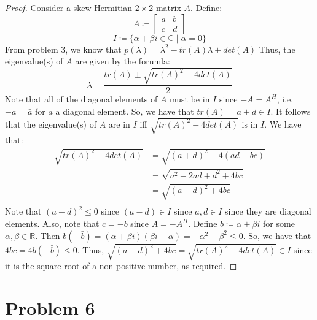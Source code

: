 \documentclass{article}
\begin{document}
\begin{proof}
Consider a skew-Hermitian $2 \times 2$ matrix $A$. Define:
$$A \coloneqq \begin{bmatrix} a & b \\ c & d \end{bmatrix}$$
$$I \coloneqq \{\alpha + \beta i \in \mathbb{C} \mid \alpha = 0\}$$
From problem 3, we know that $p(\lambda) = \lambda^2 - tr(A)\lambda + det(A)$ Thus, the eigenvalue(s) of $A$ are given by the forumla:
$$\lambda = \frac{tr(A) \pm \sqrt{tr(A)^2 - 4det(A)}}{2}$$
Note that all of the diagonal elements of $A$ must be in $I$ since $-A = A^{H}$, i.e. $-a = \bar a$ for $a$ a diagonal element. So, we have that $tr(A) = a + d \in I$. It follows that the eigenvalue(s) of $A$ are in $I$ iff $\sqrt{tr(A)^2 - 4det(A)}$ is in $I$. We have that:
\begin{align*}
\sqrt{tr(A)^2 - 4det(A)} &= \sqrt{(a + d)^2 - 4(ad - bc)} \\
&=  \sqrt{a^2 - 2ad + d^2 + 4bc} \\
&=  \sqrt{(a - d)^2 + 4bc} \\
\end{align*}
Note that $(a - d)^2 \leq 0$ since $(a - d) \in I$ since $a, d \in I$ since they are diagonal elements. Also, note that $c = -\bar b$ since $A = -A^{H}$. Define $b \coloneqq \alpha + \beta i$ for some $\alpha, \beta \in \mathbb{R}$. Then $b(-\bar b) = (\alpha + \beta i)(\beta i - \alpha) = -\alpha^2 -\beta^2 \leq 0$. So, we have that $4bc = 4b(-\bar b) \leq 0$. Thus, $\sqrt{(a - d)^2 + 4bc} = \sqrt{tr(A)^2 - 4det(A)} \in I$ since it is the square root of a non-positive number, as required.
\end{proof}


\section*{Problem 6}
\end{document}
